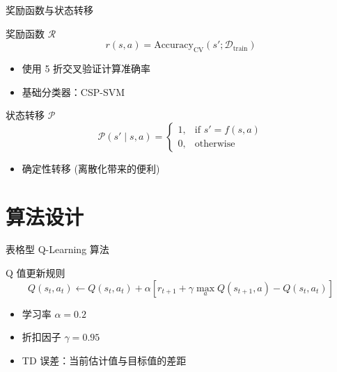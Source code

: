 \begin{frame}{奖励函数与状态转移}
    \begin{block}{奖励函数 $\mathcal{R}$}
        \[
        r(s, a) = \text{Accuracy}_{\text{CV}}(s'; \mathcal{D}_{\text{train}})
        \]
        \begin{itemize}
            \item 使用 5 折交叉验证计算准确率
            \item 基础分类器：CSP-SVM
        \end{itemize}
    \end{block}
    
    \vspace{0.3cm}
    \begin{block}{状态转移 $\mathcal{P}$}
        \[
        \mathcal{P}(s' \mid s, a) = 
        \begin{cases}
            1, & \text{if } s' = f(s, a) \\
            0, & \text{otherwise}
        \end{cases}
        \]
        \begin{itemize}
            \item 确定性转移 (离散化带来的便利)
        \end{itemize}
    \end{block}
\end{frame}

\section{算法设计}

\begin{frame}{表格型 Q-Learning 算法}
    \begin{block}{Q 值更新规则}
        \[
        Q(s_t, a_t) \leftarrow Q(s_t, a_t) + \alpha \left[ r_{t+1} + \gamma \max_{a} Q(s_{t+1}, a) - Q(s_t, a_t) \right]
        \]
        \begin{itemize}
            \item 学习率 $\alpha = 0.2$
            \item 折扣因子 $\gamma = 0.95$
            \item TD 误差：当前估计值与目标值的差距
        \end{itemize}
    \end{block}
\end{frame}

